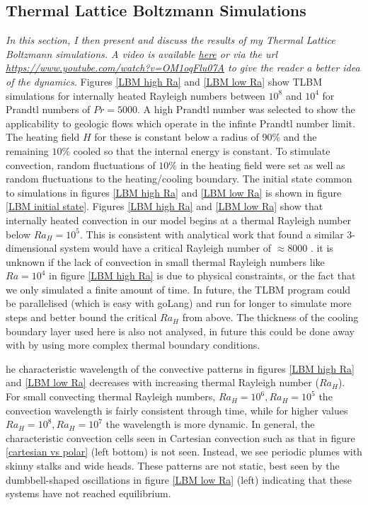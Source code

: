 \documentclass{article}
\begin{document}
\subsection*{Thermal Lattice Boltzmann Simulations}
{\it{In this section, I then present and discuss the results of my Thermal Lattice Boltzmann simulations. A video is available \href{https://www.youtube.com/watch?v=OM1oqFlu07A}{here} or via the url \url{https://www.youtube.com/watch?v=OM1oqFlu07A} to give the reader a better idea of the dynamics.}}
\vspace{0.3cm}
\newline
Figures \ref{LBM high Ra} and \ref{LBM low Ra} show TLBM simulations for internally heated Rayleigh 
numbers between $10^8$ and $10^4$ for Prandtl numbers of $Pr=5000$. A high Prandtl number was selected to show the applicability to geologic flows which operate in the infinte Prandtl number limit. The heating field $H$ for these is constant below a radius of $90 \%$ and the 
remaining $10\%$ cooled so that the internal energy is constant. To stimulate convection, random fluctuations of $10 \%$ in the heating field were set as well as random fluctuations to the heating/cooling boundary. The initial state common to simulations in figures \ref{LBM high Ra} and \ref{LBM low Ra} is shown in figure \ref{LBM initial state}. 
\newline
\noindent Figures \ref{LBM high Ra} and \ref{LBM low Ra} show that internally heated convection in our model begins at a thermal Rayleigh number below 
$Ra_H=10^5$. This is consistent with analytical work that found a similar 3-dimensional system would have a critical Rayleigh number of $\approx 8000$ \cite{babskii1971convection}. it is unknown if the lack of convection in small thermal Rayleigh numbers 
like $Ra=10^4$ in figure \ref{LBM high Ra} is due to physical constraints, or the fact that we only simulated a finite amount of time. In future, the 
TLBM program could be parallelised (which is easy with goLang) and run for longer to simulate more steps and better bound the critical $Ra_H$ from above. The thickness of the cooling boundary layer used here is also not analysed, in future this could be done away with by using more complex thermal boundary conditions.  

\noindent he characteristic wavelength of the convective patterns in figures \ref{LBM high Ra} and \ref{LBM low Ra} decreases with increasing thermal Rayleigh number ($Ra_H$). For small convecting thermal Rayleigh numbers, $Ra_H=10^6, Ra_H=10^5$ the convection wavelength is fairly consistent through time, while for higher values $Ra_H=10^8,Ra_H=10^7$ the wavelength is more dynamic. In general, the characteristic convection cells seen in Cartesian convection such as that in figure \ref{cartesian vs polar} (left bottom) is not seen. Instead, we see periodic plumes with skinny stalks and wide heads. These patterns are not static, best seen by the dumbbell-shaped oscillations in figure \ref{LBM low Ra} (left) indicating that these systems have not reached equilibrium. 
\end{document}
